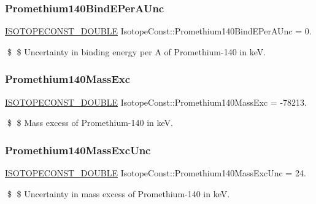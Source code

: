 \subsubsection{\texorpdfstring{Promethium140\+Bind\+E\+Per\+A\+Unc}{Promethium140BindEPerAUnc}}
{\footnotesize\ttfamily \mbox{\hyperlink{group___isotope_const-_macros_ga8f45a7272ce02c0b4c65c44636ed719a}{I\+S\+O\+T\+O\+P\+E\+C\+O\+N\+S\+T\+\_\+\+D\+O\+U\+B\+LE}} Isotope\+Const\+::\+Promethium140\+Bind\+E\+Per\+A\+Unc = 0.}

\$ \$ Uncertainty in binding energy per A of Promethium-\/140 in keV. \mbox{\label{group___isotope_const-_promethium-_pm140_ga624470353496f375b1a13ba711adea6d}} 
\subsubsection{\texorpdfstring{Promethium140\+Mass\+Exc}{Promethium140MassExc}}
{\footnotesize\ttfamily \mbox{\hyperlink{group___isotope_const-_macros_ga8f45a7272ce02c0b4c65c44636ed719a}{I\+S\+O\+T\+O\+P\+E\+C\+O\+N\+S\+T\+\_\+\+D\+O\+U\+B\+LE}} Isotope\+Const\+::\+Promethium140\+Mass\+Exc = -\/78213.}

\$ \$ Mass excess of Promethium-\/140 in keV. \mbox{\label{group___isotope_const-_promethium-_pm140_gae91f2cfcc9d343f137b1f2a7dfdb9628}} 
\subsubsection{\texorpdfstring{Promethium140\+Mass\+Exc\+Unc}{Promethium140MassExcUnc}}
{\footnotesize\ttfamily \mbox{\hyperlink{group___isotope_const-_macros_ga8f45a7272ce02c0b4c65c44636ed719a}{I\+S\+O\+T\+O\+P\+E\+C\+O\+N\+S\+T\+\_\+\+D\+O\+U\+B\+LE}} Isotope\+Const\+::\+Promethium140\+Mass\+Exc\+Unc = 24.}

\$ \$ Uncertainty in mass excess of Promethium-\/140 in keV. \mbox{\label{group___isotope_const-_promethium-_pm140_ga8b1c7dd0afe634455a22282bc0a0e229}} 
